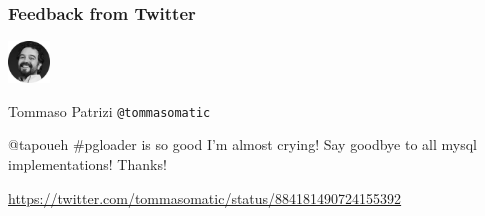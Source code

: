 \documentclass[xcolor=dvipsnames]{beamer}
\begin{document}
{

  \begin{frame}[fragile]
    \frametitle{Feedback from Twitter}

    \begin{center}
      \begin{minipage}{0,6\textwidth}
        \begin{minipage}{0,2\textwidth}
          \includegraphics[height=3em]{tommasomatic.png}
        \end{minipage}
        \begin{minipage}{0,8\textwidth}
          Tommaso Patrizi \newline
          \texttt{@tommasomatic}
        \end{minipage}
      \end{minipage}
      \rule[10pt]{0,6\textwidth}{1px}
      
      \begin{minipage}{0,6\textwidth}
        \begin{Large}
          @tapoueh \#pgloader is so good I'm almost crying! Say goodbye to
          all mysql implementations! Thanks!
        \end{Large}
      \end{minipage}
      \rule{0,6\textwidth}{1px}

      \vfill
      \url{https://twitter.com/tommasomatic/status/884181490724155392}
    \end{center}
  \end{frame}
}
\end{document}
